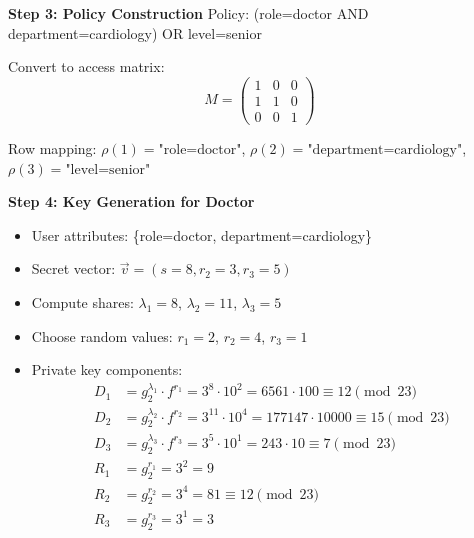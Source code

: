 \documentclass[11pt,a4paper]{article}
\begin{document}
\begin{mathbox}
\textbf{Step 3: Policy Construction}
Policy: (role=doctor AND department=cardiology) OR level=senior

Convert to access matrix:
\[M = \begin{pmatrix} 
1 & 0 & 0 \\  %
1 & 1 & 0 \\  %
0 & 0 & 1     %
\end{pmatrix}\]

Row mapping: $\rho(1) = \text{"role=doctor"}$, $\rho(2) = \text{"department=cardiology"}$, $\rho(3) = \text{"level=senior"}$
\end{mathbox}

\begin{mathbox}
\textbf{Step 4: Key Generation for Doctor}
\begin{itemize}
    \item User attributes: \{role=doctor, department=cardiology\}
    \item Secret vector: $\vec{v} = (s = 8, r_2 = 3, r_3 = 5)$
    \item Compute shares: $\lambda_1 = 8$, $\lambda_2 = 11$, $\lambda_3 = 5$
    \item Choose random values: $r_1 = 2$, $r_2 = 4$, $r_3 = 1$
    \item Private key components:
    \begin{align*}
    D_1 &= g_2^{\lambda_1} \cdot f^{r_1} = 3^8 \cdot 10^2 = 6561 \cdot 100 \equiv 12 \pmod{23} \\
    D_2 &= g_2^{\lambda_2} \cdot f^{r_2} = 3^{11} \cdot 10^4 = 177147 \cdot 10000 \equiv 15 \pmod{23} \\
    D_3 &= g_2^{\lambda_3} \cdot f^{r_3} = 3^5 \cdot 10^1 = 243 \cdot 10 \equiv 7 \pmod{23} \\
    R_1 &= g_2^{r_1} = 3^2 = 9 \\
    R_2 &= g_2^{r_2} = 3^4 = 81 \equiv 12 \pmod{23} \\
    R_3 &= g_2^{r_3} = 3^1 = 3
    \end{align*}
\end{itemize}
\end{mathbox}
\end{document}
